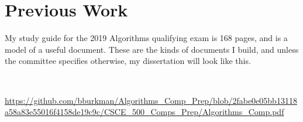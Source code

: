 \section{Previous Work}

My study guide for the 2019 Algorithms qualifying exam is 168 pages, and is a model of a useful document.  These are the kinds of documents I build, and unless the committee specifies otherwise, my dissertation will look like this.  

\

\url{https://github.com/bburkman/Algorithms_Comp_Prep/blob/2fabe0e05bb13118a58a83e55016f4158de19c9c/CSCE_500_Comps_Prep/Algorithms_Comp.pdf}


